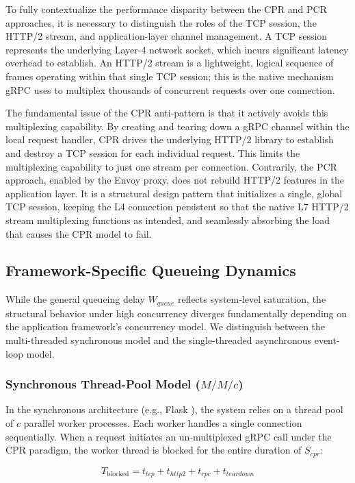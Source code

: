 \documentclass{ieeeaccess}
\begin{document}
To fully contextualize the performance disparity between the CPR and PCR approaches, it is necessary to distinguish the roles of the TCP session, the HTTP/2 stream, and application-layer channel management. A TCP session represents the underlying Layer-4 network socket, which incurs significant latency overhead to establish. An HTTP/2 stream is a lightweight, logical sequence of frames operating within that single TCP session; this is the native mechanism gRPC uses to multiplex thousands of concurrent requests over one connection.

The fundamental issue of the CPR anti-pattern is that it actively avoids this multiplexing capability. By creating and tearing down a gRPC channel within the local request handler, CPR drives the underlying HTTP/2 library to establish and destroy a TCP session for each individual request. This limits the multiplexing capability to just one stream per connection. Contrarily, the PCR approach, enabled by the Envoy proxy, does not rebuild HTTP/2 features in the application layer. It is a structural design pattern that initializes a single, global TCP session, keeping the L4 connection persistent so that the native L7 HTTP/2 stream multiplexing functions as intended, and seamlessly absorbing the load that causes the CPR model to fail.


\subsection{Framework-Specific Queueing Dynamics}
\label{sec2.4}

While the general queueing delay $W_{queue}$ reflects system-level saturation, the structural behavior under high concurrency diverges fundamentally depending on the application framework's concurrency model. We distinguish between the multi-threaded synchronous model and the single-threaded asynchronous event-loop model.

\subsubsection{Synchronous Thread-Pool Model ($M/M/c$)}
In the synchronous architecture (e.g., Flask \cite{gunicorn}), the system relies on a thread pool of $c$ parallel worker processes. Each worker handles a single connection sequentially. When a request initiates an un-multiplexed gRPC call under the CPR paradigm, the worker thread is blocked for the entire duration of $S_{cpr}$:

\begin{equation}
	T_{\text{blocked}} = t_{tcp} + t_{http2} + t_{rpc} + t_{teardown}
\end{equation}
\end{document}

